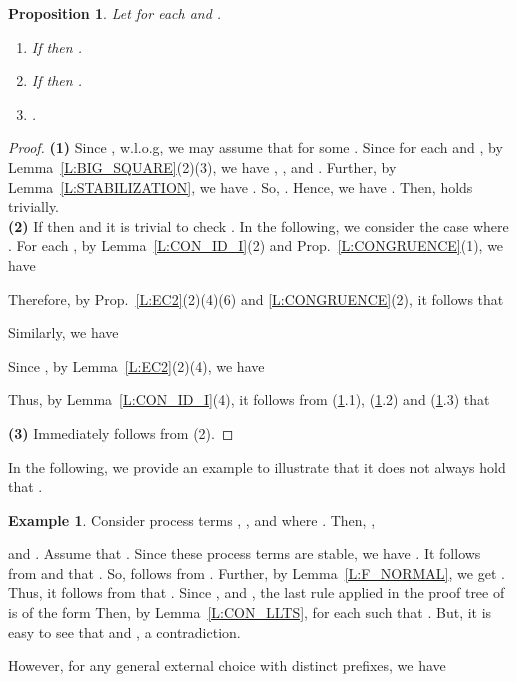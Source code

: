 \documentclass{elsarticle}
\theoremstyle{plain}
\newtheorem{proposition}[theorem]{Proposition}
\theoremstyle{definition}
\newtheorem{example}[theorem]{Example}
\begin{document}
\begin{proposition}\label{L:MULTIPLE_VI}
Let  for each  and .
  \begin{enumerate}
    \item If  then .
    \item If  then
     .
    \item .
  \end{enumerate}
\end{proposition}
\begin{proof}
  \noindent \textbf{(1)} Since , w.l.o.g, we may assume that  for some .
  Since  for each  and , by Lemma~\ref{L:BIG_SQUARE}(2)(3), we have , ,  and .
  Further, by Lemma~\ref{L:STABILIZATION}, we have .
    So, .
    Hence,  we have .
Then,  holds trivially.\\

\noindent \textbf{(2)}
If  then  and it is trivial to check .
In the following, we consider the case where .
For each , by Lemma~\ref{L:CON_ID_I}(2) and Prop.~\ref{L:CONGRUENCE}(1), we have

Therefore, by Prop.~\ref{L:EC2}(2)(4)(6) and \ref{L:CONGRUENCE}(2), it follows that

Similarly, we have

Since , by Lemma~\ref{L:EC2}(2)(4), we have

Thus, by Lemma~\ref{L:CON_ID_I}(4), it follows from (\ref{L:MULTIPLE_VI}.1), (\ref{L:MULTIPLE_VI}.2) and (\ref{L:MULTIPLE_VI}.3) that
 

\noindent \textbf{(3)} Immediately follows from (2).
\end{proof}

In the following, we provide an example to illustrate that it does not always hold that .

\begin{example}
Consider process terms
, ,  and  where .
Then, ,

and .
Assume that .
Since these process terms are stable, we have .
It follows from  and  that .
So,  follows from .
Further, by Lemma~\ref{L:F_NORMAL}, we get .
Thus, it follows from  that .
Since ,  and , the last rule applied in the proof tree of  is of the form 
Then, by Lemma~\ref{L:CON_LLTS},  for each  such that .
But, it is easy to see that  and , a contradiction.

\end{example}

However, for any general external choice  with distinct prefixes, we have
\end{document}
